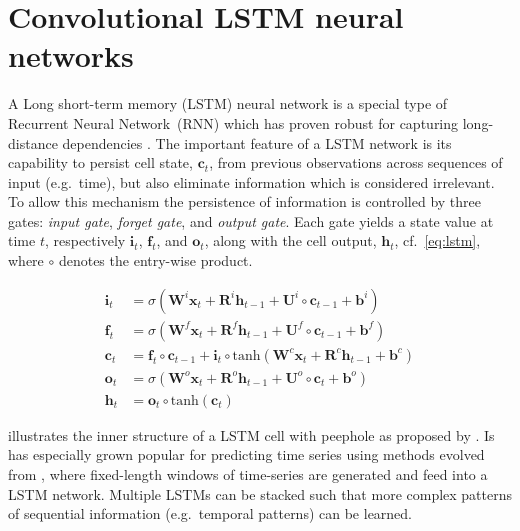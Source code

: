 \documentclass[preprint,11pt,5p,twocolumn]{elsarticle}
\newcommand{\matr}[1]{\mathbf{#1}}
\begin{document}
\section{Convolutional LSTM neural networks}
\label{sec:convlstm}
A Long short-term memory (LSTM) neural network is a special type of Recurrent Neural Network~(RNN) which has proven robust for capturing long-distance dependencies \cite{Lstm1,Lstm2}. The important feature of a LSTM network is its capability to persist cell state, $\matr{c}_t$, from previous observations across sequences of input (e.g.\ time), but also eliminate information which is considered irrelevant. To allow this mechanism the persistence of information is controlled by three gates: \emph{input gate}, \emph{forget gate}, and \emph{output gate}. Each gate yields a state value at time $t$, respectively $\matr{i}_t$, $\matr{f}_t$, and $\matr{o}_t$, along with the cell output, $\matr{h}_t$, cf.~\cref{eq:lstm}, where $\circ$ denotes the entry-wise product.

\begin{equation}
\begin{aligned}
  \matr{i}_t &= \sigma \left( \matr{W}^i \matr{x}_t + \matr{R}^i \matr{h}_{t-1} + \matr{U}^i \circ \matr{c}_{t-1} + \matr{b}^i \right) \\
  \matr{f}_t &= \sigma \left( \matr{W}^f \matr{x}_t + \matr{R}^f \matr{h}_{t-1} + \matr{U}^f \circ \matr{c}_{t-1} + \matr{b}^f \right) \\
  \matr{c}_t &= \matr{f}_t \circ \matr{c}_{t-1} + \matr{i}_t \circ \mathrm{tanh} \left( \matr{W}^c \matr{x}_t + \matr{R}^c \matr{h}_{t-1} + \matr{b}^c \right) \\
  \matr{o}_t &= \sigma \left( \matr{W}^\mathit{o} \matr{x}_t + \matr{R}^\mathit{o} \matr{h}_{t-1} + \matr{U}^\mathit{o} \circ \matr{c}_{t} + \matr{b}^o \right) \\
  \matr{h}_t &= \matr{o}_t \circ \mathrm{tanh} \left( \matr{c}_t \right)
\end{aligned}
\label{eq:lstm}
\end{equation}
\vspace{.5em}

 illustrates the inner structure of a LSTM cell with peephole as proposed by \cite{LstmPeephole}. 
Is has especially grown popular for predicting time series using methods evolved from \cite{LstmTs}, where fixed-length windows of time-series are generated and feed into a LSTM network. Multiple LSTMs can be stacked such that more complex patterns of sequential information (e.g.\ temporal patterns) can be learned.
\end{document}
